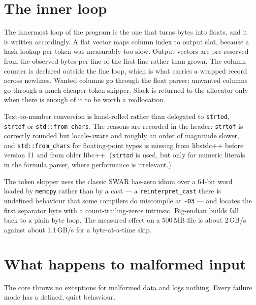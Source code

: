\documentclass[11pt,a4paper,oneside]{report}
\newcommand{\code}[1]{\texttt{#1}}
\begin{document}
\section{The inner loop}

The innermost loop of the program is the one that turns bytes into floats, and it
is written accordingly. A flat vector maps column index to output slot, because a
hash lookup per token was measurably too slow. Output vectors are pre-reserved
from the observed bytes-per-line of the first line rather than grown. The column
counter is declared outside the line loop, which is what carries a wrapped record
across newlines. Wanted columns go through the float parser; unwanted columns go
through a much cheaper token skipper. Slack is returned to the allocator only
when there is enough of it to be worth a reallocation.

Text-to-number conversion is hand-rolled rather than delegated to
\code{strtod}, \code{strtof} or \code{std::from\_chars}. The reasons are recorded
in the header: \code{strtof} is correctly rounded but locale-aware and roughly an
order of magnitude slower, and \code{std::from\_chars} for floating-point types
is missing from libstdc++ before version 11 and from older libc++.
(\code{strtod} is used, but only for numeric literals in the formula parser,
where performance is irrelevant.)

The token skipper uses the classic SWAR has-zero idiom over a 64-bit word loaded
by \code{memcpy} rather than by a cast --- a \code{reinterpret\_cast} there is
undefined behaviour that some compilers do miscompile at \code{-O3} --- and
locates the first separator byte with a count-trailing-zeros intrinsic.
Big-endian builds fall back to a plain byte loop. The measured effect on a
500\,MB file is about 2\,GB/s against about 1.1\,GB/s for a byte-at-a-time skip.

\section{What happens to malformed input}

The core throws no exceptions for malformed data and logs nothing. Every failure
mode has a defined, quiet behaviour.
\end{document}
